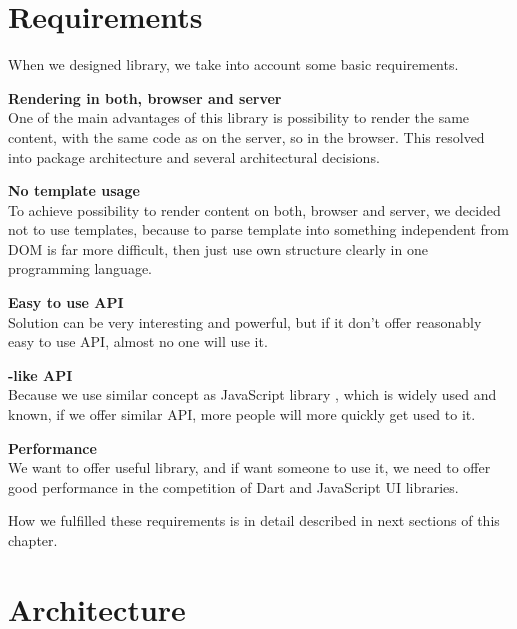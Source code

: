 \documentclass[oneside, 12pt]{book}
\begin{document}
\section{Requirements}\label{subsec:our-architecture-requirements}

  When we designed \tiles library, we take into account some basic requirements. 
  \begin{description}
    \item{\textbf{Rendering in both, browser and server}} \hfill \\
      One of the main advantages of this library is possibility to render the same content, 
      with the same code as on the server, so in the browser.
      This resolved into package architecture and several architectural decisions.
      \begin{description}
        \item{\textbf{No template usage}} \hfill \\
          To achieve possibility to render content on both, browser and server, 
          we decided not to use templates, 
          because to parse template into something independent from DOM is far more difficult,
          then just use own structure clearly in one programming language.
      \end{description}
    \item{\textbf{Easy to use API}} \hfill \\
      Solution can be very interesting and powerful, 
      but if it don't offer reasonably easy to use API, almost no one will use it.
      \begin{description}
				\item{\textbf{\react-like API}} \hfill \\
					Because we use similar concept as JavaScript library \react,  
          which is widely used and known, 
          if we offer similar API, more people will more quickly get used to it.
      \end{description}
    \item{\textbf{Performance}} \hfill \\
      We want to offer useful library, and if want someone to use it, 
      we need to offer good performance in the competition of Dart and JavaScript UI libraries.
  \end{description}

  How we fulfilled these requirements is in detail described in next sections of this chapter.

\section{Architecture}\label{sec:our-architecture}
\end{document}
